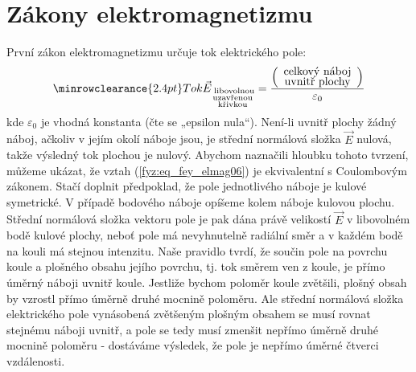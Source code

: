   \section{Zákony elektromagnetizmu}
    První zákon elektromagnetizmu určuje tok elektrického pole:
    \begin{equation}\label{fyz:eq_fey_elmag06}
      \renewcommand\arraystretch{0.6} \setlength\minrowclearance{2.4pt}
      \text{Tok }\vec{E}_{\substack{\text{ libovolnou}\\\text{uzavřenou}\\\text{křivkou}}}
        = \frac{
          \left(\begin{array}{c}
            \text{celkový náboj}    \\
            \text{uvnitř plochy}
          \end{array}
        \right)      
        }{\varepsilon_0}
    \end{equation}
    kde \(\varepsilon_0\) je vhodná konstanta (čte se „epsilon nula“). Není-li uvnitř plochy žádný 
    náboj, ačkoliv v jejím okolí náboje jsou, je střední normálová složka \(\vec{E}\) nulová, takže 
    výsledný tok plochou je nulový. Abychom naznačili hloubku tohoto tvrzení, můžeme ukázat, že 
    vztah (\ref{fyz:eq_fey_elmag06}) je ekvivalentní s Coulombovým zákonem. Stačí doplnit 
    předpoklad, že pole jednotlivého náboje je kulové symetrické. V případě bodového náboje opíšeme 
    kolem náboje kulovou plochu. Střední normálová složka vektoru pole je pak dána právě velikostí 
    \(\vec{E}\) v libovolném bodě kulové plochy, neboť pole má nevyhnutelně radiální směr a v 
    každém bodě na kouli má stejnou intenzitu. Naše pravidlo tvrdí, že součin pole na povrchu koule 
    a plošného obsahu jejího povrchu, tj. tok směrem ven z koule, je přímo úměrný náboji uvnitř 
    koule. Jestliže bychom poloměr koule zvětšili, plošný obsah by vzrostl přímo úměrně druhé 
    mocnině poloměru. Ale střední normálová složka elektrického pole vynásobená zvětšeným plošným 
    obsahem se musí rovnat stejnému náboji uvnitř, a pole se tedy musí zmenšit nepřímo úměrně druhé 
    mocnině poloměru - dostáváme výsledek, že pole je nepřímo úměrné čtverci vzdálenosti.
    
